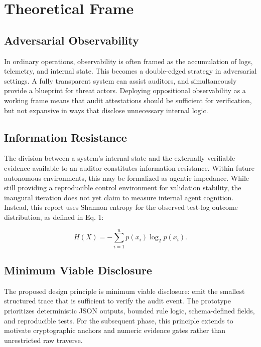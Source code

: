 \documentclass[11pt]{article}
\begin{document}
\section{Theoretical Frame}

\subsection{Adversarial Observability}

In ordinary operations, observability is often framed as the accumulation of logs, telemetry, and internal state. This becomes a double-edged strategy in adversarial settings. A fully transparent system can assist auditors, and simultaneously provide a blueprint for threat actors. Deploying oppositional 
observability as a working frame means that audit attestations should be sufficient for verification, but not expansive in ways that disclose unnecessary internal logic.

\subsection{Information Resistance}

The division between a system's internal state and the externally verifiable evidence available to an auditor constitutes information resistance. Within future autonomous environments, this may be formalized as agentic impedance. While still providing a reproducible control environment for validation stability, the inaugural iteration does not yet claim to measure internal agent cognition. Instead, this report uses Shannon entropy \cite{shannon} for the observed test-log outcome distribution, as defined in Eq. 1:

\begin{equation} 
H(X) = -\sum_{i=1}^{n} p(x_i)\log_2 p(x_i).
\label{eq:shannon_entropy}
\end{equation}

\subsection{Minimum Viable Disclosure}

The proposed design principle is minimum viable disclosure: emit the smallest structured trace that is sufficient to verify the audit event. The prototype prioritizes deterministic JSON outputs, bounded rule logic, schema-defined fields, and reproducible tests. For the subsequent phase, this principle extends to motivate cryptographic anchors and numeric evidence gates rather than unrestricted raw traverse.
\end{document}

